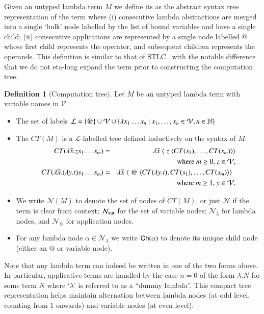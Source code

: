 \documentclass{elsarticle}
\makeatletter
\theoremstyle{plain}
\theoremstyle{definition}
\newtheorem{definition}{Definition}[section]
\theoremstyle{remark}
\newcommand\VarSet{\mathcal{V}}
\newcommand\Nodes{\mathcal{N}}%
\newcommand\NodesVar{\Nodes_{\sf var}}%
\newcommand\NodesLmd{\Nodes_\lambda}%
\newcommand\NodesApp{\Nodes_@}%
\newcommand{\child}{{\small \sf Ch}} %
\newcommand{\ctree}{CT} %
\makeatother
\begin{document}
Given an untyped lambda term $M$ we define its  as the abstract syntax tree representation of the term where (i) consecutive lambda abstractions are merged into a single `bulk' node labelled by the list of bound variables and have a single child; (ii) consecutive applications are represented by a single node labelled $@$ whose first child represents the operator, and subsequent children represents the operands.
This definition is similar to that of STLC~\cite{Ong2006, BlumPhd} with the notable difference that we do not eta-long expand the term prior to constructing the computation tree.
\begin{definition}[Computation tree]
Let $M$ be an untyped lambda term with variable names in $\VarSet$.
\begin{itemize}
\item The set of labels
$\mathcal{L} = \{ @ \} \union \VarSet \union \{ \lambda x_1 \ldots x_n \ | \ x_1 ,\ldots, x_n \in
    \VarSet, n\in\nat \}$
\item
    The  $\ctree(M)$ is a $\mathcal{L}$-labelled tree defined inductively on the syntax of $M$:
    \begin{eqnarray*}
        \ctree(\lambda \overline{x} . z s_1 \ldots s_m) &=& \lambda \overline{x}\; \langle\; z\; \langle \ctree(s_1),\ldots,\ctree(s_m)\rangle\rangle\\
        && \hbox {where $m\geq 0$, $z \in \VarSet$}, \\
 \ctree(\lambda \overline{x} . (\lambda y.t) s_1 \ldots s_m) &=& \lambda \overline{x}\; \langle\; @ \; \langle \ctree(\lambda y.t),\ctree(s_1),\ldots,\ctree(s_m) \rangle \rangle \enspace\\
&&  \hbox{where $m\geq 1$, $y\in \VarSet$}.
    \end{eqnarray*}

\item We write $\Nodes(M)$ to denote the set of nodes of $\ctree(M)$, or just $\Nodes$ if the term is clear from context; $\NodesVar$ for the set of variable nodes; $\NodesLmd$ for lambda nodes, and $\NodesApp$ for  application nodes.

\item For any lambda node $\alpha\in\NodesLmd$ we write $\child(\alpha)$ to denote its unique child node (either an $@$ or variable node).
\end{itemize}
\end{definition}

Note that any lambda term can indeed be written in one of the two forms above. In particular, applicative terms are handled by the case $n=0$ of the form $\lambda . N$ for some term $N$ where `$\lambda$' is referred to as a ``dummy lambda''. This compact tree representation helps maintain alternation between lambda nodes (at odd level, counting from 1 onwards) and variable nodes (at even level).
\end{document}
